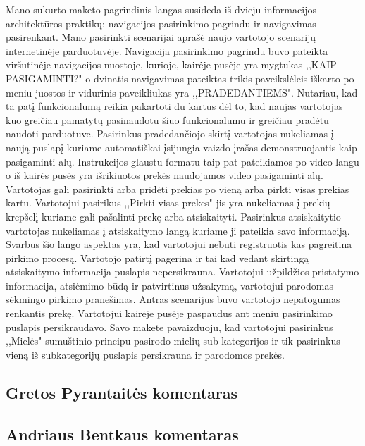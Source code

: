 \documentclass[oneside]{VUMIFPSkursinis}
\begin{document}
Mano sukurto maketo pagrindinis langas susideda iš dvieju informacijos architektūros praktikų: navigacijos pasirinkimo pagrindu ir navigavimas pasirenkant. 
Mano pasirinkti scenarijai aprašė naujo vartotojo scenarijų internetinėje parduotuvėje. 
Navigacija pasirinkimo pagrindu buvo pateikta viršutinėje navigacijos nuostoje, kurioje, kairėje pusėje yra mygtukas ,,KAIP PASIGAMINTI?" o dvinatis navigavimas pateiktas trikis paveikslėleis iškarto po meniu juostos ir vidurinis paveikliukas yra ,,PRADEDANTIEMS". 
Nutariau, kad ta patį funkcionalumą reikia pakartoti du kartus dėl to, kad naujas vartotojas kuo greičiau pamatytų pasinaudotu šiuo funkcionalumu ir greičiau pradėtu naudoti parduotuve. 
Pasirinkus pradedančiojo skirtį vartotojas nukeliamas į naują puslapį kuriame automatiškai įsijungia vaizdo įrašas demonstruojantis kaip pasigaminti alų. 
Instrukcijos glaustu formatu taip pat pateikiamos po video langu o iš kairės pusės yra išrikiuotos prekės naudojamos video pasigaminti alų.
Vartotojas gali pasirinkti arba pridėti prekias po vieną arba pirkti visas prekias kartu. 
Vartotojui pasirikus ,,Pirkti visas prekes" jis yra nukeliamas į prekių krepšelį kuriame gali pašalinti prekę arba atsiskaityti. 
Pasirinkus atsiskaitytio vartotojas nukeliamas į atsiskaitymo langą kuriame ji pateikia savo informaciją. 
Svarbus šio lango aspektas yra, kad vartotojui nebūti registruotis kas pagreitina pirkimo procesą. 
Vartotojo patirtį pagerina ir tai kad vedant skirtingą atsiskaitymo informacija puslapis nepersikrauna.
 Vartotojui užpildžios pristatymo informacija, atsiėmimo būdą ir patvirtinus užsakymą, vartotojui parodomas sėkmingo pirkimo pranešimas. \newline
Antras scenarijus buvo vartotojo nepatogumas renkantis prekę.
Vartotojui kairėje pusėje paspaudus ant meniu pasirinkimo puslapis persikraudavo.
Savo makete pavaizduoju, kad vartotojui pasirinkus ,,Mielės" sumuštinio principu pasirodo mielių sub-kategorijos ir tik pasirinkus vieną iš subkategorijų puslapis persikrauna ir parodomos prekės.
	\subsection{Gretos Pyrantaitės komentaras}
	\subsection{Andriaus Bentkaus komentaras}
\end{document}
